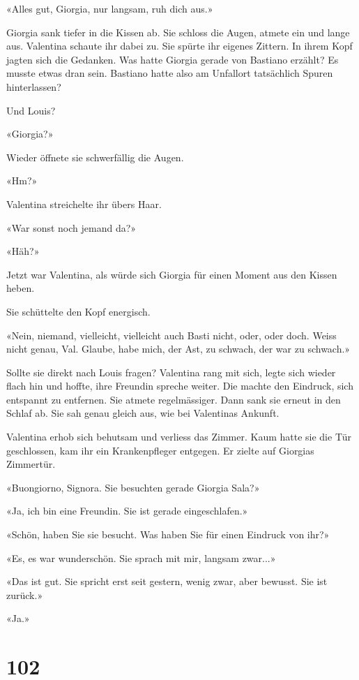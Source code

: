 «Alles gut, Giorgia, nur langsam, ruh dich aus.»

Giorgia sank tiefer in die Kissen ab. Sie schloss die Augen, atmete ein
und lange aus. Valentina schaute ihr dabei zu. Sie spürte ihr eigenes
Zittern. In ihrem Kopf jagten sich die Gedanken. Was hatte Giorgia
gerade von Bastiano erzählt? Es musste etwas dran sein. Bastiano hatte
also am Unfallort tatsächlich Spuren hinterlassen?

Und Louis?

«Giorgia?»

Wieder öffnete sie schwerfällig die Augen.

«Hm?»

Valentina streichelte ihr übers Haar.

«War sonst noch jemand da?»

«Häh?»

Jetzt war Valentina, als würde sich Giorgia für einen Moment aus den
Kissen heben.

Sie schüttelte den Kopf energisch.

«Nein, niemand, vielleicht, vielleicht auch Basti nicht, oder, oder
doch. Weiss nicht genau, Val. Glaube, habe mich, der Ast, zu schwach,
der war zu schwach.»

Sollte sie direkt nach Louis fragen? Valentina rang mit sich, legte sich
wieder flach hin und hoffte, ihre Freundin spreche weiter. Die machte
den Eindruck, sich entspannt zu entfernen. Sie atmete regelmässiger.
Dann sank sie erneut in den Schlaf ab. Sie sah genau gleich aus, wie bei
Valentinas Ankunft.

Valentina erhob sich behutsam und verliess das Zimmer. Kaum hatte sie
die Tür geschlossen, kam ihr ein Krankenpfleger entgegen. Er zielte auf
Giorgias Zimmertür.

«Buongiorno, Signora. Sie besuchten gerade Giorgia Sala?»

«Ja, ich bin eine Freundin. Sie ist gerade eingeschlafen.»

«Schön, haben Sie sie besucht. Was haben Sie für einen Eindruck von
ihr?»

«Es, es war wunderschön. Sie sprach mit mir, langsam zwar...»

«Das ist gut. Sie spricht erst seit gestern, wenig zwar, aber bewusst.
Sie ist zurück.»

«Ja.»

\chapter{102}\label{section-102}


